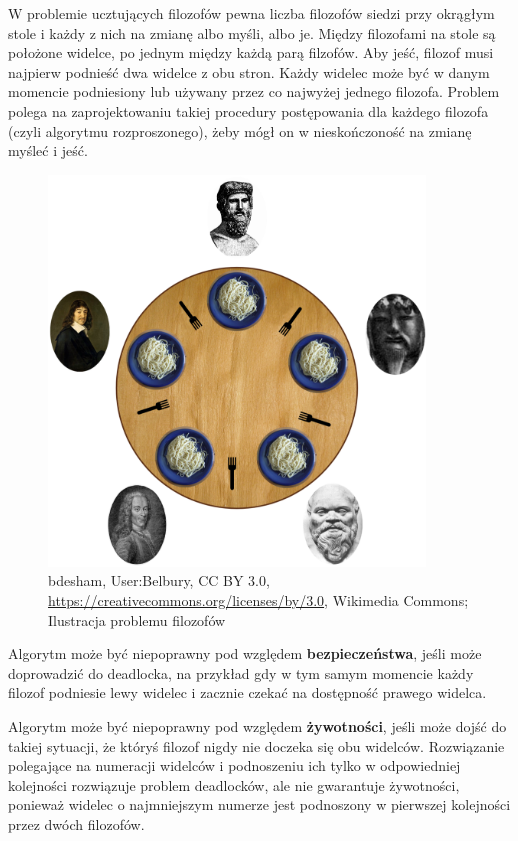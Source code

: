 W problemie ucztujących filozofów pewna liczba filozofów siedzi przy okrągłym stole i każdy z nich na zmianę albo myśli, albo je. Między filozofami na stole są położone widelce, po jednym między każdą parą filzofów. Aby jeść, filozof musi najpierw podnieść dwa widelce z obu stron. Każdy widelec może być w danym momencie podniesiony lub używany przez co najwyżej jednego filozofa. Problem polega na zaprojektowaniu takiej procedury postępowania dla każdego filozofa (czyli algorytmu rozproszonego), żeby mógł on w nieskończoność na zmianę myśleć i jeść.

\begin{figure}[H]  
    \centering
    \includegraphics[width=10cm]{chapters/sysopy/filozofowie/An_illustration_of_the_dining_philosophers_problem.png}
\caption{bdesham, User:Belbury, CC BY 3.0, \url{https://creativecommons.org/licenses/by/3.0}, Wikimedia Commons; Ilustracja problemu filozofów}
\end{figure}

Algorytm może być niepoprawny pod względem \textbf{bezpieczeństwa}, jeśli może doprowadzić do deadlocka, na przykład gdy w tym samym momencie każdy filozof podniesie lewy widelec i zacznie czekać na dostępność prawego widelca. 

Algorytm może być niepoprawny pod względem \textbf{żywotności}, jeśli może dojść do takiej sytuacji, że któryś filozof nigdy nie doczeka się obu widelców. Rozwiązanie polegające na numeracji widelców i podnoszeniu ich tylko w odpowiedniej kolejności rozwiązuje problem deadlocków, ale nie gwarantuje żywotności, ponieważ widelec o najmniejszym numerze jest podnoszony w pierwszej kolejności przez dwóch filozofów.

